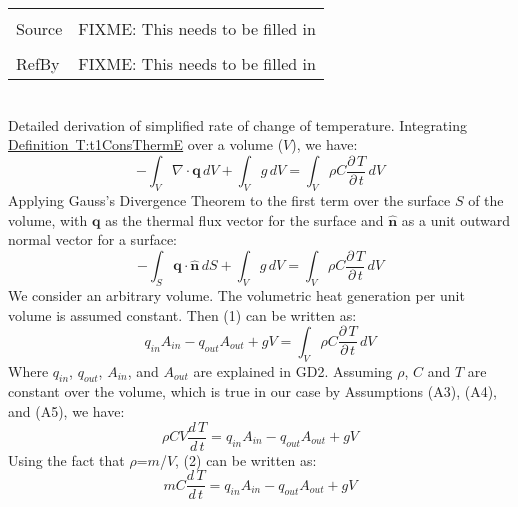 \documentclass[12pt]{article}
\begin{document}
\begin{minipage}{\textwidth}
\begin{tabular}{p{} p{}}
\\ \midrule \\
Source & FIXME: This needs to be filled in
\\ \midrule \\
RefBy & FIXME: This needs to be filled in
\\ \bottomrule \end{tabular}
\end{minipage}\\
Detailed derivation of simplified rate of change of temperature.
Integrating \hyperref[T:t1ConsThermE]{Definition~T:t1ConsThermE} over a volume ($V$), we have:
\begin{dmath}
-\int_{V}{∇\cdot{}\mathbf{q}}\,dV+\int_{V}{g}\,dV=\int_{V}{ρ C \frac{\partial{}\,T}{\partial{}\,t}}\,dV
\end{dmath}
Applying Gauss's Divergence Theorem to the first term over the surface $S$ of the volume, with $\mathbf{q}$ as the thermal flux vector for the surface and $\mathbf{\hat{n}}$ as a unit outward normal vector for a surface:
\begin{dmath}
-\int_{S}{\mathbf{q}\cdot{}\mathbf{\hat{n}}}\,dS+\int_{V}{g}\,dV=\int_{V}{ρ C \frac{\partial{}\,T}{\partial{}\,t}}\,dV
\end{dmath}
We consider an arbitrary volume. The volumetric heat generation per unit volume is assumed constant. Then (1) can be written as:
\begin{dmath}
{q_{in}} {A_{in}}-{q_{out}} {A_{out}}+g V=\int_{V}{ρ C \frac{\partial{}\,T}{\partial{}\,t}}\,dV
\end{dmath}
Where ${q_{in}}$, ${q_{out}}$, ${A_{in}}$, and ${A_{out}}$ are explained in GD2. Assuming $ρ$, $C$ and $T$ are constant over the volume, which is true in our case by Assumptions (A3), (A4), and (A5), we have:
\begin{dmath}
ρ C V \frac{d\,T}{d\,t}={q_{in}} {A_{in}}-{q_{out}} {A_{out}}+g V
\end{dmath}
Using the fact that $ρ$=$m$/$V$, (2) can be written as:
\begin{dmath}
m C \frac{d\,T}{d\,t}={q_{in}} {A_{in}}-{q_{out}} {A_{out}}+g V
\end{dmath}
\end{document}
